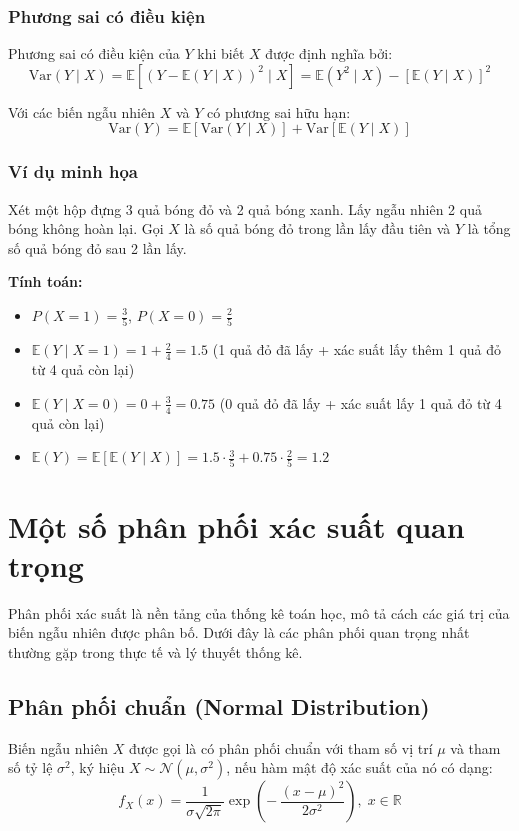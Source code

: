 \subsubsection*{Phương sai có điều kiện}
\begin{dn}
Phương sai có điều kiện của $Y$ khi biết $X$ được định nghĩa bởi:
\[
\text{Var}(Y \mid X) = \mathbb{E}[(Y - \mathbb{E}(Y \mid X))^2 \mid X] = \mathbb{E}(Y^2 \mid X) - [\mathbb{E}(Y \mid X)]^2
\]
\end{dn}

\begin{dl}
Với các biến ngẫu nhiên $X$ và $Y$ có phương sai hữu hạn:
\[
\text{Var}(Y) = \mathbb{E}[\text{Var}(Y \mid X)] + \text{Var}[\mathbb{E}(Y \mid X)]
\]
\end{dl}

\subsubsection*{Ví dụ minh họa}
Xét một hộp đựng 3 quả bóng đỏ và 2 quả bóng xanh. Lấy ngẫu nhiên 2 quả bóng không hoàn lại. Gọi $X$ là số quả bóng đỏ trong lần lấy đầu tiên và $Y$ là tổng số quả bóng đỏ sau 2 lần lấy.

\textbf{Tính toán:}
\begin{itemize}
    \item $P(X = 1) = \frac{3}{5}$, $P(X = 0) = \frac{2}{5}$
    \item $\mathbb{E}(Y \mid X = 1) = 1 + \frac{2}{4} = 1.5$ (1 quả đỏ đã lấy + xác suất lấy thêm 1 quả đỏ từ 4 quả còn lại)
    \item $\mathbb{E}(Y \mid X = 0) = 0 + \frac{3}{4} = 0.75$ (0 quả đỏ đã lấy + xác suất lấy 1 quả đỏ từ 4 quả còn lại)
    \item $\mathbb{E}(Y) = \mathbb{E}[\mathbb{E}(Y \mid X)] = 1.5 \cdot \frac{3}{5} + 0.75 \cdot \frac{2}{5} = 1.2$
\end{itemize}

\section{Một số phân phối xác suất quan trọng}

Phân phối xác suất là nền tảng của thống kê toán học, mô tả cách các giá trị của biến ngẫu nhiên được phân bố. Dưới đây là các phân phối quan trọng nhất thường gặp trong thực tế và lý thuyết thống kê.

\subsection{Phân phối chuẩn (Normal Distribution)}
\begin{dn}
Biến ngẫu nhiên $X$ được gọi là có phân phối chuẩn với tham số vị trí $\mu$ và tham số tỷ lệ $\sigma^2$, ký hiệu $X\sim\mathcal{N}(\mu,\sigma^2)$, nếu hàm mật độ xác suất của nó có dạng:
\[
f_X(x)=\frac{1}{\sigma\sqrt{2\pi}}\exp\!\left(-\,\frac{(x-\mu)^2}{2\sigma^2}\right),\; x\in\mathbb{R}
\]
\end{dn}

